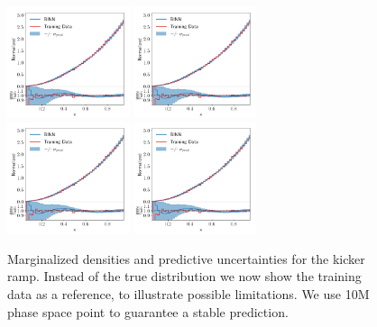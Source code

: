 \begin{figure}[t]
\centering
\includegraphics[width=0.32\textwidth,page=3]{./figures/bINN/quadratic_1dhists_with_unc}
\hspace*{0.1\textwidth}
\includegraphics[width=0.32\textwidth,page=4]{./figures/bINN/quadratic_1dhists_with_unc}\\
\includegraphics[width=0.32\textwidth,page=1]{./figures/bINN/quadratic_1dhists_with_unc}
\hspace*{0.1\textwidth}
\includegraphics[width=0.32\textwidth,page=2]{./figures/bINN/quadratic_1dhists_with_unc}
\caption{Marginalized densities and predictive uncertainties for the
  kicker ramp. Instead of the true distribution we now show the training data as a reference, to illustrate possible limitations. We use 10M phase space point to guarantee a stable prediction.}
\label{fig:marginalized}
\end{figure}

